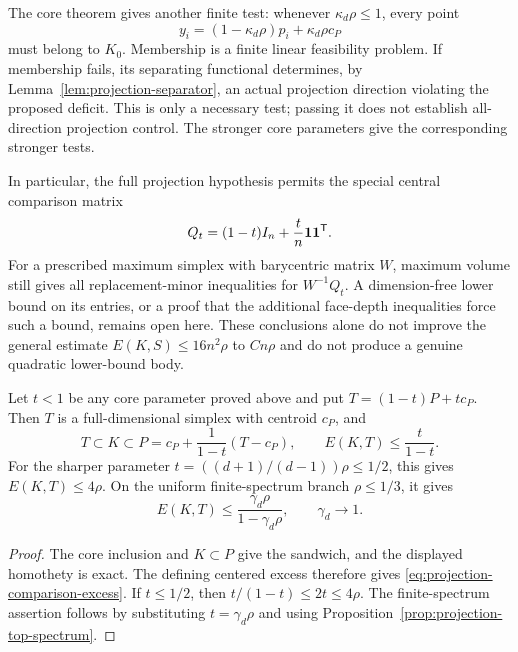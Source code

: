 The core theorem gives another finite test: whenever
$\kappa_d\rho\leq1$, every point
\[
 y_i=(1-\kappa_d\rho)p_i+\kappa_d\rho c_P
\]
must belong to $K_0$.  Membership is a finite linear feasibility
problem.  If membership fails, its separating functional determines,
by Lemma~\ref{lem:projection-separator}, an actual projection
direction violating the proposed deficit.  This is only a necessary
test; passing it does not establish all-direction projection control.
The stronger core parameters give the corresponding stronger tests.

In particular, the full projection hypothesis permits the special
central comparison matrix
\[
 Q_t=(1-t)I_n+\frac t n\mathbf 1\mathbf 1^{\mathsf T}.
\]
For a prescribed maximum simplex with barycentric matrix $W$, maximum
volume still gives all replacement-minor inequalities for
$W^{-1}Q_t$.  A dimension-free lower bound on its entries, or a proof
that the additional face-depth inequalities force such a bound,
remains open here.  These conclusions alone do not improve the
general estimate $E(K,S)\leq16n^2\rho$ to $Cn\rho$ and do not
produce a genuine quadratic lower-bound body.

\begin{corollary}
\label{cor:projection-concentric-comparison}
Let $t<1$ be any core parameter proved above and put
$T=(1-t)P+t c_P$.  Then $T$ is a full-dimensional simplex with
centroid $c_P$, and
\begin{equation}
 T\subset K\subset P
 =c_P+\frac1{1-t}(T-c_P),\qquad
 E(K,T)\leq\frac t{1-t}.
 \label{eq:projection-comparison-excess}
\end{equation}
For the sharper parameter $t=((d+1)/(d-1))\rho\leq1/2$, this gives
$E(K,T)\leq4\rho$.  On the uniform finite-spectrum branch
$\rho\leq1/3$, it gives
\begin{equation}
 E(K,T)\leq\frac{\gamma_d\rho}{1-\gamma_d\rho},
 \qquad \gamma_d\longrightarrow1.
 \label{eq:projection-finite-excess}
\end{equation}
\end{corollary}

\begin{proof}
The core inclusion and $K\subset P$ give the sandwich, and the
displayed homothety is exact.  The defining centered excess therefore
gives \eqref{eq:projection-comparison-excess}.  If $t\leq1/2$,
then $t/(1-t)\leq2t\leq4\rho$.  The finite-spectrum assertion
follows by substituting $t=\gamma_d\rho$ and using
Proposition~\ref{prop:projection-top-spectrum}.
\end{proof}

